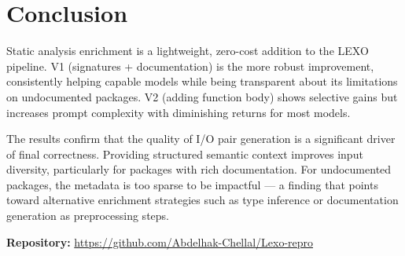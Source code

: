 \documentclass[11pt,a4paper]{article}
\begin{document}
\section{Conclusion}

Static analysis enrichment is a lightweight, zero-cost addition to the LEXO pipeline. V1 (signatures + documentation) is the more robust improvement, consistently helping capable models while being transparent about its limitations on undocumented packages. V2 (adding function body) shows selective gains but increases prompt complexity with diminishing returns for most models.

The results confirm that the quality of I/O pair generation is a significant driver of final correctness. Providing structured semantic context improves input diversity, particularly for packages with rich documentation. For undocumented packages, the metadata is too sparse to be impactful — a finding that points toward alternative enrichment strategies such as type inference or documentation generation as preprocessing steps.

\bigskip
\noindent\textbf{Repository:} \url{https://github.com/Abdelhak-Chellal/Lexo-repro}
\end{document}

